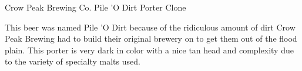 \stylesection{\styleamericanporter}

\begin{recipie}{Crow Peak Brewing Co. Pile 'O Dirt Porter Clone}

\begin{aboutblock}
This beer was named Pile 'O Dirt because of the ridiculous amount of dirt Crow
Peak Brewing had to build their original brewery on to get them out of the flood
plain. This porter is very dark in color with a nice tan head and complexity
due to the variety of specialty malts used. \sourceaha
\end{aboutblock}


\begin{methodandtiming}
 
\begin{mashsteps}
\end{mashsteps}

\begin{fermentationsteps}
\end{fermentationsteps}

\end{methodandtiming}

\pagebreak

\begin{ingredientsblock}

\begin{malts}
\end{malts}

\begin{hops}
\end{hops}


\end{ingredientsblock}

\end{recipie}
